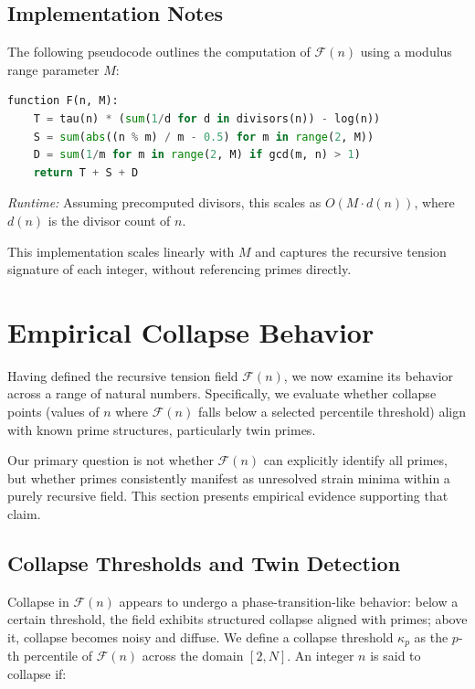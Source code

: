 \documentclass[11pt]{article}
\begin{document}
\subsection{Implementation Notes}

The following pseudocode outlines the computation of $\mathcal{F}(n)$ using a modulus range parameter $M$:

\begin{lstlisting}[language=Python,caption={Pseudocode for computing $\mathcal{F}(n)$},label={lst:pseudocode}]
function F(n, M):
    T = tau(n) * (sum(1/d for d in divisors(n)) - log(n))
    S = sum(abs((n % m) / m - 0.5) for m in range(2, M))
    D = sum(1/m for m in range(2, M) if gcd(m, n) > 1)
    return T + S + D
\end{lstlisting}
\noindent \textit{Runtime:} Assuming precomputed divisors, this scales as $O(M \cdot d(n))$, where $d(n)$ is the divisor count of $n$.


This implementation scales linearly with $M$ and captures the recursive tension signature of each integer, without referencing primes directly.

\section{Empirical Collapse Behavior}

Having defined the recursive tension field \(\mathcal{F}(n)\), we now examine its behavior across a range of natural numbers. Specifically, we evaluate whether collapse points (values of \(n\) where \(\mathcal{F}(n)\) falls below a selected percentile threshold) align with known prime structures, particularly twin primes.

Our primary question is not whether $\mathcal{F}(n)$ can explicitly identify all primes, but whether primes consistently manifest as unresolved strain minima within a purely recursive field. This section presents empirical evidence supporting that claim.

\subsection{Collapse Thresholds and Twin Detection}

Collapse in $\mathcal{F}(n)$ appears to undergo a phase-transition-like behavior: below a certain threshold, the field exhibits structured collapse aligned with primes; above it, collapse becomes noisy and diffuse. We define a collapse threshold $\kappa_p$ as the $p$-th percentile of $\mathcal{F}(n)$ across the domain $[2, N]$. An integer \(n\) is said to collapse if:
\end{document}
